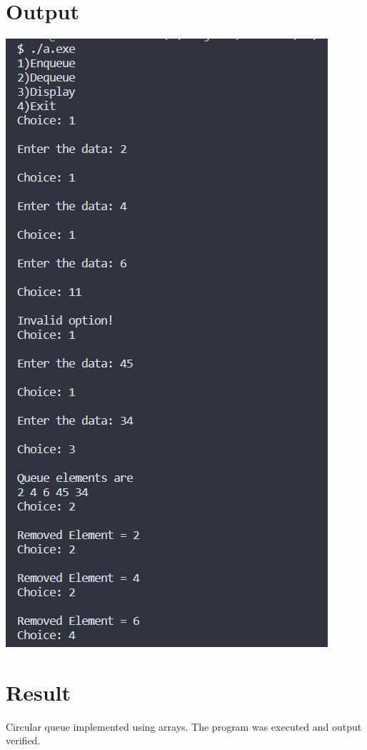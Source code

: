 \section{Output}
\includegraphics[]{Cycle_1/Outputs/CircularQueue.png}
\section{Result}
Circular queue implemented using arrays. The program was executed and output verified.
